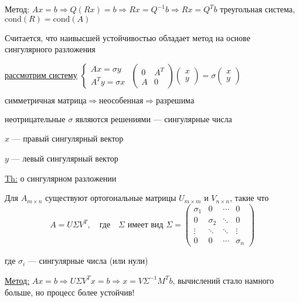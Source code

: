 \begin{enumerate}
    Метод: \( Ax = b \Rightarrow Q(Rx) = b \Rightarrow Rx = Q^{-1} b \Rightarrow Rx = Q^{T} b \) треугольная система, \( \text{cond}(R) = \text{cond}(A) \)

    Считается, что наивысшей устойчивостью обладает метод на основе сингулярного разложения
    
    \underline{рассмотрим систему}
    \(
    \begin{cases} 
    Ax = \sigma y \\ 
    A^Ty = \sigma x 
    \end{cases}
    \)
    \rightarrow
    \(
    \left( \begin{array}{cc}
    0 & A^{T} \\
    A & 0
    \end{array} \right)
    \left( \begin{array}{c}
    x \\
    y
    \end{array} \right) = \sigma \left( \begin{array}{c}
    x \\
    y
    \end{array} \right)
    \)

    \(\text{симметричная матрица} \Rightarrow \text{неособенная} \Rightarrow \text{разрешима}\)

\leftskip=0cm неотрицательные \( \sigma\) являются решениями — сингулярные числа

\leftskip=3.3cm \( x \) — правый сингулярный вектор

\leftskip=3.3cm \( y \) — левый сингулярный вектор  

\leftskip=0cm

    \underline{Th:} о сингулярном разложении
    
    Для \(A_{m \times n}\) существуют ортогональные матрицы \(U_{m \times m}\) и \(V_{n \times n}\), такие что
    \[A = U \Sigma V^T, \quad \text{где} \quad \Sigma \text{ имеет вид } \Sigma = 
    \begin{pmatrix}
    \sigma_1 & 0 & \cdots & 0 \\ 
    0 & \sigma_2 & \ddots  & 0 \\ 
    \vdots & \ddots & \ddots & \vdots \\
    0 & 0 & \cdots & \sigma_n
    \end{pmatrix}\]
    
где \(\sigma_i\) — сингулярные числа (или нули)

    \underline{Метод:} \(Ax=b \Rightarrow U \Sigma V^Tx=b \Rightarrow x=V \Sigma^{-1}M^Tb\), вычислений стало намного больше, но процесс более устойчив!


\end{enumerate}

